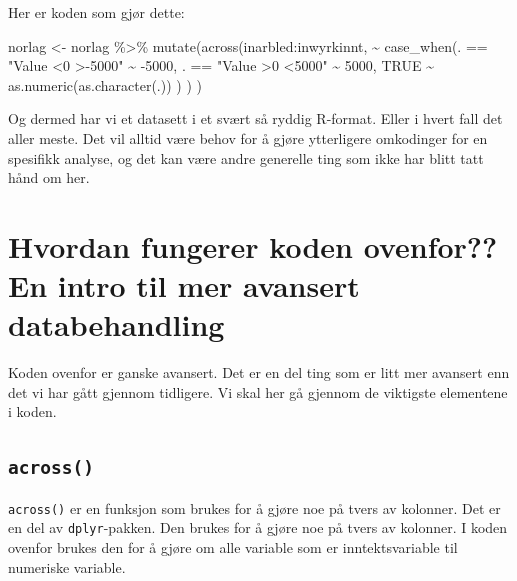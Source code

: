 \documentclass[
  norsk,
  letterpaper,
  DIV=11,
  numbers=noendperiod]{scrreprt}
\newenvironment{Shaded}{\begin{snugshade}}{\end{snugshade}}
\newcommand{\ConstantTok}[1]{\textcolor[rgb]{0.56,0.35,0.01}{#1}}
\newcommand{\DecValTok}[1]{\textcolor[rgb]{0.68,0.00,0.00}{#1}}
\newcommand{\FunctionTok}[1]{\textcolor[rgb]{0.28,0.35,0.67}{#1}}
\newcommand{\NormalTok}[1]{\textcolor[rgb]{0.00,0.23,0.31}{#1}}
\newcommand{\OtherTok}[1]{\textcolor[rgb]{0.00,0.23,0.31}{#1}}
\newcommand{\SpecialCharTok}[1]{\textcolor[rgb]{0.37,0.37,0.37}{#1}}
\newcommand{\StringTok}[1]{\textcolor[rgb]{0.13,0.47,0.30}{#1}}
\theoremstyle{definition}
\theoremstyle{remark}
\begin{document}
Her er koden som gjør dette:

\begin{Shaded}
\begin{Highlighting}[]
\NormalTok{norlag }\OtherTok{\textless{}{-}}\NormalTok{ norlag }\SpecialCharTok{\%\textgreater{}\%} 
    \FunctionTok{mutate}\NormalTok{(}\FunctionTok{across}\NormalTok{(inarbled}\SpecialCharTok{:}\NormalTok{inwyrkinnt, }
                \SpecialCharTok{\textasciitilde{}} \FunctionTok{case\_when}\NormalTok{(. }\SpecialCharTok{==} \StringTok{"Value \textless{}0 \textgreater{}{-}5000"} \SpecialCharTok{\textasciitilde{}} \SpecialCharTok{{-}}\DecValTok{5000}\NormalTok{, }
\NormalTok{                            . }\SpecialCharTok{==} \StringTok{"Value \textgreater{}0 \textless{}5000"} \SpecialCharTok{\textasciitilde{}} \DecValTok{5000}\NormalTok{,}
                            \ConstantTok{TRUE} \SpecialCharTok{\textasciitilde{}} \FunctionTok{as.numeric}\NormalTok{(}\FunctionTok{as.character}\NormalTok{(.))}
\NormalTok{                            )}
\NormalTok{                )}
\NormalTok{           )}
\end{Highlighting}
\end{Shaded}

Og dermed har vi et datasett i et svært så ryddig R-format. Eller i
hvert fall det aller meste. Det vil alltid være behov for å gjøre
ytterligere omkodinger for en spesifikk analyse, og det kan være andre
generelle ting som ikke har blitt tatt hånd om her.

\section{Hvordan fungerer koden ovenfor?? En intro til mer avansert
databehandling}\label{hvordan-fungerer-koden-ovenfor-en-intro-til-mer-avansert-databehandling}

Koden ovenfor er ganske avansert. Det er en del ting som er litt mer
avansert enn det vi har gått gjennom tidligere. Vi skal her gå gjennom
de viktigste elementene i koden.

\subsection{\texorpdfstring{\texttt{across()}}{across()}}\label{across}

\texttt{across()} er en funksjon som brukes for å gjøre noe på tvers av
kolonner. Det er en del av \texttt{dplyr}-pakken. Den brukes for å gjøre
noe på tvers av kolonner. I koden ovenfor brukes den for å gjøre om alle
variable som er inntektsvariable til numeriske variable.
\end{document}
